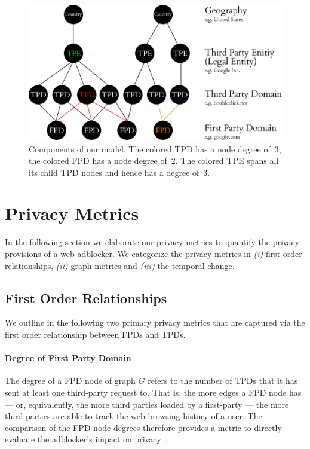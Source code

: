\begin{figure}[tb!]
  \centering 
  \includegraphics[width=\textwidth]{figures/graph.eps}
  \caption{Components of our model. The colored TPD has a node degree of~3, the colored FPD has a node degree of~2. The colored TPE spans all its child TPD nodes and hence has a degree of~3.}
  \label{fig:graph}
\end{figure}

\section{Privacy Metrics}
In the following section we elaborate our privacy metrics to quantify the privacy provisions of a web adblocker. We categorize the privacy metrics in \emph{(i)} first order relationships, \emph{(ii)} graph metrics and \emph{(iii)} the temporal change.

\subsection{First Order Relationships}
We outline in the following two primary privacy metrics that are captured via the first order relationship between FPDs and TPDs.

\paragraph{Degree of First Party Domain}
The degree of a FPD node of graph $G$ refers to the number of TPDs that it has sent at least one third-party request to. That is, the more edges a FPD node has --- or, equivalently, the more third parties loaded by a first-party --- the more third parties are able to track the web-browsing history of a user. The comparison of the FPD-node degrees therefore provides a metric to directly evaluate the adblocker's impact on privacy~\cite{ruffel2015}.

